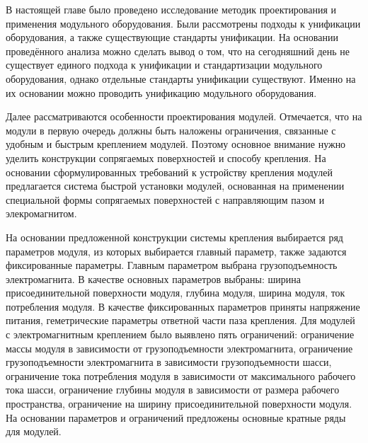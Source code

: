 В настоящей главе было проведено исследование методик проектирования и применения модульного оборудования. Были рассмотрены подходы к унификации оборудования, а также существующие стандарты унификации. На основании проведённого анализа можно сделать вывод о том, что на сегодняшний день не существует единого подхода к унификации и стандартизации модульного оборудования, однако отдельные стандарты унификации существуют. Именно на их основании можно проводить унификацию модульного оборудования. 

Далее рассматриваются особенности проектирования модулей. Отмечается, что на модули в первую очередь должны быть наложены ограничения, связанные с удобным и быстрым креплением модулей. Поэтому основное внимание нужно уделить конструкции сопрягаемых поверхностей и способу крепления. На основании сформулированных требований к устройству крепления модулей предлагается система быстрой установки модулей, основанная на применении специальной формы сопрягаемых поверхностей с направляющим пазом и элекромагнитом.

На основании предложенной конструкции системы крепления выбирается ряд параметров модуля, из которых выбирается главный параметр, также задаются фиксированные параметры. Главным параметром выбрана грузоподъемность электромагнита. В качестве основных параметров выбраны: ширина присоединительной поверхности модуля, глубина модуля, ширина модуля, ток потребления модуля. В качестве фиксированных параметров приняты напряжение питания, геметрические параметры ответной части паза крепления. Для модулей с электромагнитным креплением было выявлено пять ограничений: ограничение массы модуля в зависимости от грузоподъемности электромагнита, ограничение грузоподъемности электромагнита в зависимости грузоподъемности шасси, ограничение тока потребления модуля в зависимости от максимального рабочего тока шасси, ограничение глубины модуля в зависимости от размера рабочего пространства, ограничение на ширину присоединительной поверхности модуля. На основании параметров и ограничений предложены основные кратные ряды для модулей.

